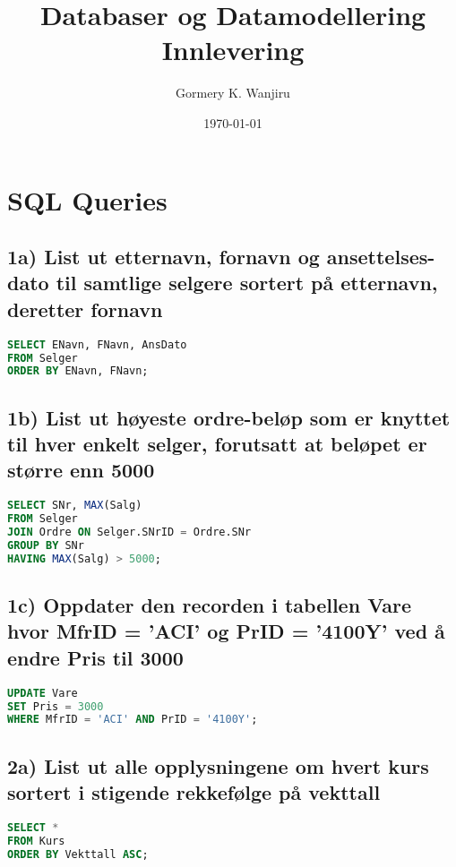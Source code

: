 \documentclass{article}
\title{Databaser og Datamodellering Innlevering}
\author{Gormery K. Wanjiru}
\date{\today}
\begin{document}
\maketitle

\section*{SQL Queries}

\subsection*{1a) List ut etternavn, fornavn og ansettelses-dato til samtlige selgere sortert på etternavn, deretter fornavn}

\begin{lstlisting}[language=SQL]
SELECT ENavn, FNavn, AnsDato
FROM Selger
ORDER BY ENavn, FNavn;
\end{lstlisting}

\subsection*{1b) List ut høyeste ordre-beløp som er knyttet til hver enkelt selger, forutsatt at beløpet er større enn 5000}

\begin{lstlisting}[language=SQL]
SELECT SNr, MAX(Salg)
FROM Selger
JOIN Ordre ON Selger.SNrID = Ordre.SNr
GROUP BY SNr
HAVING MAX(Salg) > 5000;
\end{lstlisting}

\subsection*{1c) Oppdater den recorden i tabellen Vare hvor MfrID = 'ACI' og PrID = '4100Y' ved å endre Pris til 3000}

\begin{lstlisting}[language=SQL]
UPDATE Vare
SET Pris = 3000
WHERE MfrID = 'ACI' AND PrID = '4100Y';
\end{lstlisting}

\subsection*{2a) List ut alle opplysningene om hvert kurs sortert i stigende rekkefølge på vekttall}

\begin{lstlisting}[language=SQL]
SELECT *
FROM Kurs
ORDER BY Vekttall ASC;
\end{lstlisting}
\end{document}
